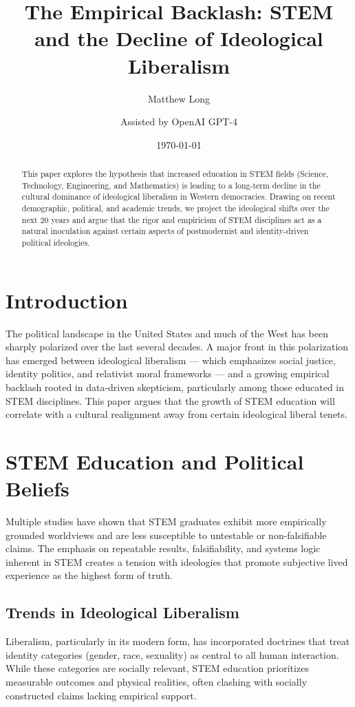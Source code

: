 \documentclass[11pt]{article}
\title{The Empirical Backlash: STEM and the Decline of Ideological Liberalism}
\author[1]{Matthew Long}
\author[2]{Assisted by OpenAI GPT-4}
\affil[1]{Yoneda AI Research Lab}
\affil[2]{Language Modeling Division}
\date{\today}
\begin{document}
\maketitle

\begin{abstract}
This paper explores the hypothesis that increased education in STEM fields (Science, Technology, Engineering, and Mathematics) is leading to a long-term decline in the cultural dominance of ideological liberalism in Western democracies. Drawing on recent demographic, political, and academic trends, we project the ideological shifts over the next 20 years and argue that the rigor and empiricism of STEM disciplines act as a natural inoculation against certain aspects of postmodernist and identity-driven political ideologies.
\end{abstract}

\section{Introduction}
The political landscape in the United States and much of the West has been sharply polarized over the last several decades. A major front in this polarization has emerged between ideological liberalism --- which emphasizes social justice, identity politics, and relativist moral frameworks --- and a growing empirical backlash rooted in data-driven skepticism, particularly among those educated in STEM disciplines. This paper argues that the growth of STEM education will correlate with a cultural realignment away from certain ideological liberal tenets.

\section{STEM Education and Political Beliefs}
Multiple studies have shown that STEM graduates exhibit more empirically grounded worldviews and are less susceptible to untestable or non-falsifiable claims. The emphasis on repeatable results, falsifiability, and systems logic inherent in STEM creates a tension with ideologies that promote subjective lived experience as the highest form of truth.

\subsection{Trends in Ideological Liberalism}
Liberalism, particularly in its modern form, has incorporated doctrines that treat identity categories (gender, race, sexuality) as central to all human interaction. While these categories are socially relevant, STEM education prioritizes measurable outcomes and physical realities, often clashing with socially constructed claims lacking empirical support.
\end{document}
